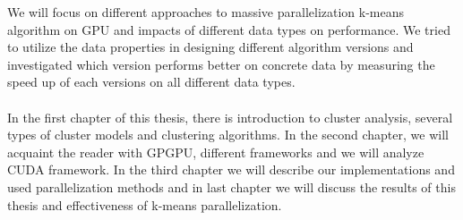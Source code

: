We will focus on different approaches to massive parallelization k-means algorithm on GPU and impacts of different data types on performance. We tried to utilize the data properties in designing different algorithm versions and investigated which version performs better on concrete data by measuring the speed up of each versions on all different data types.\\
\\
In the first chapter of this thesis, there is introduction to cluster analysis, several types of cluster models and clustering algorithms. In the second chapter, we will acquaint the reader with GPGPU, different frameworks and we will analyze CUDA framework. In the third chapter we will describe our implementations and used parallelization methods and in last chapter we will discuss the results of this thesis and effectiveness of k-means parallelization. 